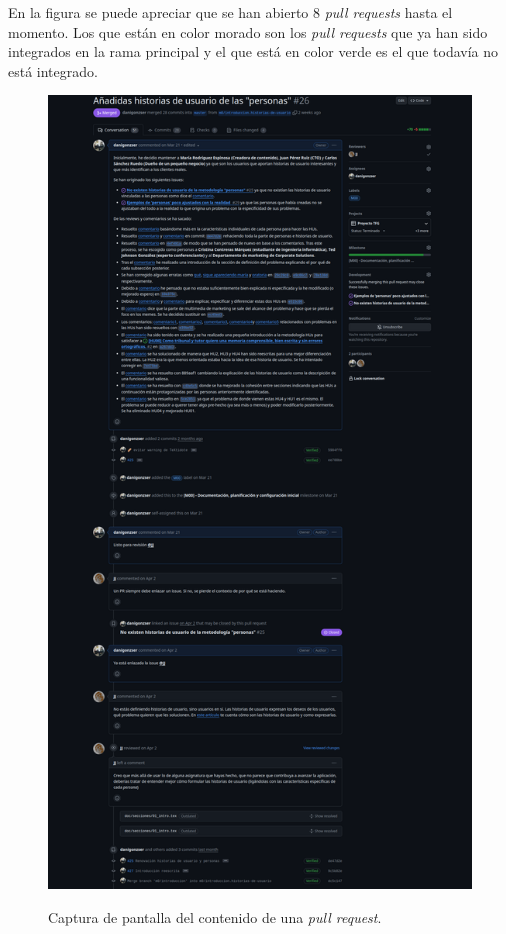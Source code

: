 En la figura se puede apreciar que se han abierto 8 \textit{pull requests} hasta el momento. Los que están en color morado son los \textit{pull requests} que ya han sido integrados en la rama principal y el que está en color verde es el que todavía no está integrado.

\begin{figure}[H]
    \caption{Captura de pantalla del contenido de una \textit{pull request}.}
    \centering
    \vspace*{0.5cm}
    \includegraphics[scale=0.1]{figuras/pull_request_github.png}\label{fig:contenido_pull_request}
\end{figure}

